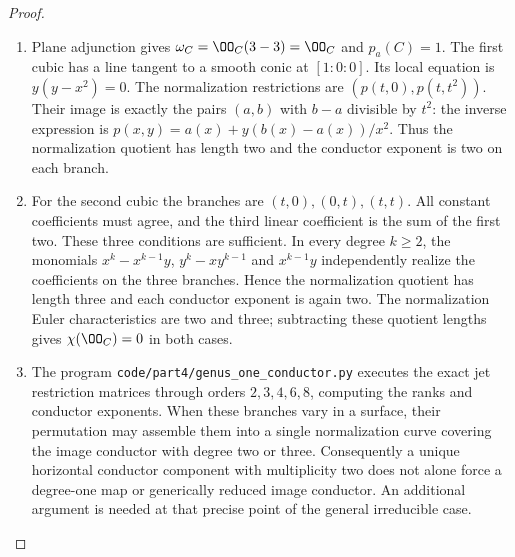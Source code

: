 \begin{proof}

\begin{enumerate}[label={$\langle1\rangle$\arabic*.},leftmargin=*]
\item Plane adjunction gives $\omega_C=\OO_C(3-3)=\OO_C$ and
$p_a(C)=1$. The first cubic has a line tangent to a smooth
conic at $[1:0:0]$. Its local equation is $y(y-x^2)=0$.
The normalization restrictions are $(p(t,0),p(t,t^2))$.
Their image is exactly the pairs $(a,b)$ with $b-a$ divisible
by $t^2$: the inverse expression is
$p(x,y)=a(x)+y(b(x)-a(x))/x^2$. Thus the normalization
quotient has length two and the conductor exponent is two on
each branch.

\item For the second cubic the branches are $(t,0),(0,t),(t,t)$.
All constant coefficients must agree, and the third linear
coefficient is the sum of the first two. These three conditions
are sufficient. In every degree $k\ge2$, the monomials
$x^k-x^{k-1}y$, $y^k-xy^{k-1}$ and $x^{k-1}y$ independently
realize the coefficients on the three branches. Hence the
normalization quotient has length three and each conductor
exponent is again two. The normalization Euler characteristics
are two and three; subtracting these quotient lengths gives
$\chi(\OO_C)=0$ in both cases.

\item The program \texttt{code/part4/genus\_one\_conductor.py}
executes the exact jet restriction matrices through orders
$2,3,4,6,8$, computing the ranks and conductor exponents.
When these branches vary in a surface, their permutation may
assemble them into a single normalization curve covering the
image conductor with degree two or three. Consequently a
unique horizontal conductor component with multiplicity two
does not alone force a degree-one map or generically reduced
image conductor. An additional argument is needed at that
precise point of the general irreducible case.

\end{enumerate}
\end{proof}
